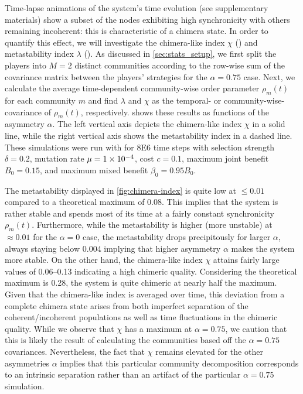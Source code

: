 \documentclass[pdflatex,lineno,referee,sn-mathphys-ay]{sn-jnl}
\begin{document}
Time-lapse animations of the system's time evolution
(see supplementary materials)
show a subset of the nodes exhibiting high synchronicity
with others remaining incoherent: this is characteristic of a chimera state.
In order to quantify this effect, we will investigate
the chimera-like index $\chi$ ()
and metastability index $\lambda$ ().
As discussed in \cref{sec:stats_setup},
we first split the players into $M=2$ distinct communities
according to the row-wise sum of the covariance matrix
between the players' strategies for the $\alpha = \num{0.75}$ case.
Next, we calculate the average time-dependent community-wise
order parameter $\rho_m(t)$
for each community $m$ and find $\lambda$ and $\chi$
as the temporal- or community-wise- covariance of
$\rho_m(t)$, respectively.
 shows these results
as functions of the asymmetry $\alpha$.
The left vertical axis depicts the chimera-like index $\chi$
in a solid line,
while the right vertical axis shows the metastability index
in a dashed line.
These simulations were run with
for \num{8E6} time steps with
selection strength $\delta = 0.2$,
mutation rate $\mu=\num{1E-4}$,
cost $c = \num{0.1}$,
maximum joint benefit $B_0 = 0.15$,
and maximum mixed benefit $\beta_0 = \num{0.95} B_0$.

The metastability displayed in \cref{fig:chimera-index}
is quite low at $\le \num{0.01}$ compared
to a theoretical maximum of \num{0.08}.
This implies that the system is rather stable
and spends most of its time at a fairly constant
synchronicity $\rho_m(t)$.
Furthermore, while the metastability is higher (more unstable)
at $\approx \num{0.01}$ for the $\alpha = 0$ case,
the metastability drops precipitously for larger $\alpha$,
always staying below \num{0.004} implying that
higher asymmetry $\alpha$ makes the system more stable.
On the other hand, the chimera-like index $\chi$
attains fairly large values of \numrange{0.06}{0.13}
indicating a high chimeric quality.
Considering the theoretical maximum is \num{0.28},
the system is quite chimeric at nearly half the maximum.
Given that the chimera-like index is averaged over time,
this deviation from a complete chimera state
arises from both imperfect separation of the coherent/incoherent populations
as well as time fluctuations in the chimeric quality.
While we observe that $\chi$ has a maximum at $\alpha = \num{0.75}$,
we caution that this is likely the result of calculating the communities
based off the $\alpha = \num{0.75}$ covariances.
Nevertheless, the fact that $\chi$ remains elevated
for the other asymmetries $\alpha$
implies that this particular community decomposition
corresponds to an intrinsic separation rather than an artifact
of the particular $\alpha = \num{0.75}$ simulation.
\end{document}
